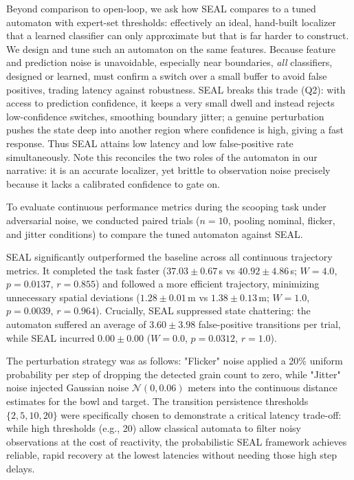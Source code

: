 Beyond comparison to open-loop, we ask how SEAL compares to a tuned automaton with expert-set thresholds: effectively an ideal, hand-built localizer that a learned classifier can only approximate but that is far harder to construct. We design and tune such an automaton on the same features. Because feature and prediction noise is unavoidable, especially near boundaries, \emph{all} classifiers, designed or learned, must confirm a switch over a small buffer to avoid false positives, trading latency against robustness. SEAL breaks this trade (Q2): with access to prediction confidence, it keeps a very small dwell and instead rejects low-confidence switches, smoothing boundary jitter; a genuine perturbation pushes the state deep into another region where confidence is high, giving a fast response. Thus SEAL attains low latency and low false-positive rate simultaneously. Note this reconciles the two roles of the automaton in our narrative: it is an accurate localizer, yet brittle to observation noise precisely because it lacks a calibrated confidence to gate on.

To evaluate continuous performance metrics during the scooping task under adversarial noise, we conducted paired trials ($n=10$, pooling nominal, flicker, and jitter conditions) to compare the tuned automaton against SEAL.

SEAL significantly outperformed the baseline across all continuous trajectory metrics. It completed the task faster ($37.03 \pm 0.67$\,s vs $40.92 \pm 4.86$\,s; $W{=}4.0$, $p{=}0.0137$, $r{=}0.855$) and followed a more efficient trajectory, minimizing unnecessary spatial deviations ($1.28 \pm 0.01$\,m vs $1.38 \pm 0.13$\,m; $W{=}1.0$, $p{=}0.0039$, $r{=}0.964$). Crucially, SEAL suppressed state chattering: the automaton suffered an average of $3.60 \pm 3.98$ false-positive transitions per trial, while SEAL incurred $0.00 \pm 0.00$ ($W{=}0.0$, $p{=}0.0312$, $r{=}1.0$).

The perturbation strategy was as follows: "Flicker" noise applied a 20\% uniform probability per step of dropping the detected grain count to zero, while "Jitter" noise injected Gaussian noise $\mathcal{N}(0, 0.06)$ meters into the continuous distance estimates for the bowl and target. The transition persistence thresholds $\{2, 5, 10, 20\}$ were specifically chosen to demonstrate a critical latency trade-off: while high thresholds (e.g., 20) allow classical automata to filter noisy observations at the cost of reactivity, the probabilistic SEAL framework achieves reliable, rapid recovery at the lowest latencies without needing those high step delays.
 
